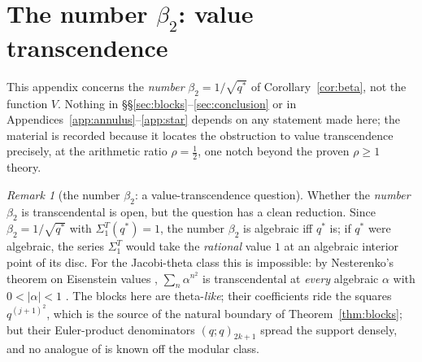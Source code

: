 \documentclass[11pt]{article}
\theoremstyle{plain}
\theoremstyle{definition}
\theoremstyle{remark}
\newtheorem{remark}[theorem]{Remark}
\begin{document}
\section{The number \texorpdfstring{$\beta_2$}{beta2}: value transcendence}\label{app:beta2}

This appendix concerns the \emph{number} $\beta_2=1/\sqrt{q^\ast}$ of Corollary~\ref{cor:beta},
not the function $V$. Nothing in \S\S\ref{sec:blocks}--\ref{sec:conclusion} or in
Appendices~\ref{app:annulus}--\ref{app:star} depends on any statement made here; the material is
recorded because it locates the obstruction to value transcendence precisely, at the arithmetic
ratio $\rho=\tfrac12$, one notch beyond the proven $\rho\ge1$ theory.

\begin{remark}[the number $\beta_2$: a value-transcendence question]\label{rem:betanumber}
Whether the \emph{number} $\beta_2$ is transcendental is open, but the question has a clean
reduction. Since $\beta_2=1/\sqrt{q^\ast}$ with $\Sigma_1^T(q^\ast)=1$, the number $\beta_2$ is
algebraic iff $q^\ast$ is; if $q^\ast$ were algebraic, the series $\Sigma_1^T$ would take the
\emph{rational} value $1$ at an algebraic interior point of its disc. For the Jacobi-theta class
this is impossible: by Nesterenko's theorem on Eisenstein values \cite{Nesterenko1996},
$\sum_n\alpha^{n^2}$ is transcendental at \emph{every} algebraic $\alpha$ with $0<|\alpha|<1$
\cite{DNNS1996}. The blocks here are theta-\emph{like}; their coefficients ride the squares
$q^{(j+1)^2}$, which is the source of the natural boundary of Theorem~\ref{thm:blocks}; but
their Euler-product denominators $(q;q)_{2k+1}$ spread the support densely, and no analogue of
\cite{Nesterenko1996} is known off the modular class.


\end{remark}
\end{document}

